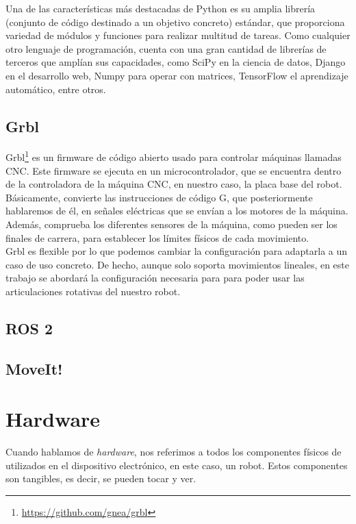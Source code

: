 Una de las características más destacadas de Python es su amplia librería (conjunto de código destinado a un objetivo concreto) estándar, que proporciona 
variedad de módulos y funciones para realizar multitud de tareas. Como cualquier otro lenguaje de programación, cuenta con una gran cantidad de librerías de terceros que 
amplían sus capacidades, como SciPy en la ciencia de datos, Django en el desarrollo web, Numpy para operar con matrices, TensorFlow el aprendizaje automático, entre otros.

\subsection{Grbl}
\label{subsec:grbl}
Grbl\footnote{\url{https://github.com/gnea/grbl}} es un firmware de código abierto usado para controlar máquinas llamadas \acs{CNC}. Este firmware se ejecuta en 
un microcontrolador, que se encuentra dentro de la controladora de la máquina \acs{CNC}, en nuestro caso, la placa base del robot. \\
Básicamente, convierte las instrucciones de código G, que posteriormente hablaremos de él, en señales eléctricas que se envían a los motores de la máquina. Además, 
comprueba los diferentes sensores de la máquina, como pueden ser los finales de carrera, para establecer los límites físicos de cada movimiento. \\
Grbl es flexible por lo que podemos cambiar la configuración para adaptarla a un caso de uso concreto. De hecho, aunque solo soporta movimientos lineales,
en este trabajo se abordará la configuración necesaria para para poder usar las articulaciones rotativas del nuestro robot.

\subsection{ROS 2}
\label{subsec:ros2}

\subsection{MoveIt!}
\label{subsec:moveit}

\section{Hardware}
\label{sec:hardware}
Cuando hablamos de \textit{hardware}, nos referimos a todos los componentes físicos de utilizados en el dispositivo electrónico, en este caso, un robot. Estos 
componentes son tangibles, es decir, se pueden tocar y ver.
